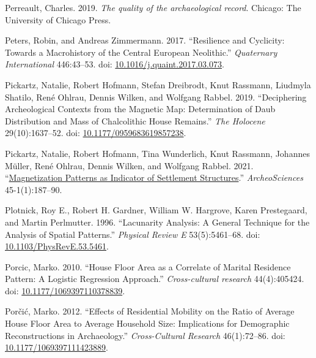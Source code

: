 \documentclass[
  12pt,
]{book}
\newlength{\cslhangindent}
\newlength{\cslentryspacingunit} %
\newenvironment{CSLReferences}[2] %
 {%
  \setlength{\parindent}{0pt}
  \ifodd #1
  \let\oldpar\par
  \def\par{\hangindent=\cslhangindent\oldpar}
  \fi
  \setlength{\parskip}{#2\cslentryspacingunit}
 }%
 {}
\begin{document}
\begin{CSLReferences}{1}{0}
\leavevmode{}%
Perreault, Charles. 2019. \emph{The quality of the archaeological record}. Chicago: The University of Chicago Press.

\leavevmode{}%
Peters, Robin, and Andreas Zimmermann. 2017. {``Resilience and Cyclicity: Towards a Macrohistory of the Central European Neolithic.''} \emph{Quaternary International} 446:43--53. doi: \href{https://doi.org/10.1016/j.quaint.2017.03.073}{10.1016/j.quaint.2017.03.073}.

\leavevmode{}%
Pickartz, Natalie, Robert Hofmann, Stefan Dreibrodt, Knut Rassmann, Liudmyla Shatilo, René Ohlrau, Dennis Wilken, and Wolfgang Rabbel. 2019. {``Deciphering Archeological Contexts from the Magnetic Map: Determination of Daub Distribution and Mass of Chalcolithic House Remains.''} \emph{The Holocene} 29(10):1637--52. doi: \href{https://doi.org/10.1177/0959683619857238}{10.1177/0959683619857238}.

\leavevmode{}%
Pickartz, Natalie, Robert Hofmann, Tina Wunderlich, Knut Rassmann, Johannes Müller, René Ohlrau, Dennis Wilken, and Wolfgang Rabbel. 2021. {``\href{https://www.cairn.info/revue-archeosciences-2021-1-page-187.htm}{Magnetization Patterns as Indicator of Settlement Structures}.''} \emph{ArcheoSciences} 45-1(1):187--90.

\leavevmode{}%
Plotnick, Roy E., Robert H. Gardner, William W. Hargrove, Karen Prestegaard, and Martin Perlmutter. 1996. {``Lacunarity Analysis: A General Technique for the Analysis of Spatial Patterns.''} \emph{Physical Review E} 53(5):5461--68. doi: \href{https://doi.org/10.1103/PhysRevE.53.5461}{10.1103/PhysRevE.53.5461}.

\leavevmode{}%
Porcic, Marko. 2010. {``House Floor Area as a Correlate of Marital Residence Pattern: A Logistic Regression Approach.''} \emph{Cross-cultural research} 44(4):405424. doi: \href{https://doi.org/10.1177/1069397110378839}{10.1177/1069397110378839}.

\leavevmode{}%
Porčić, Marko. 2012. {``Effects of Residential Mobility on the Ratio of Average House Floor Area to Average Household Size: Implications for Demographic Reconstructions in Archaeology.''} \emph{Cross-Cultural Research} 46(1):72--86. doi: \href{https://doi.org/10.1177/1069397111423889}{10.1177/1069397111423889}.


\end{CSLReferences}
\end{document}

